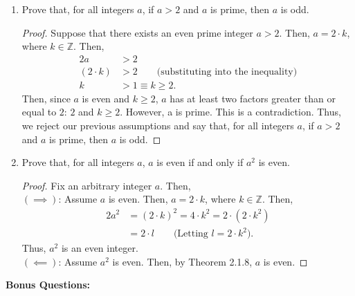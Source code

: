 \documentclass{article}
\begin{document}
\begin{enumerate}
	\item Prove that, for all integers $a$, if $a > 2$ and $a$ is prime, then $a$ is odd.
            \begin{proof}
                Suppose that there exists an even prime integer $a > 2$. Then, $a = 2\cdot k$, where $k\in \mathbb{Z}$. Then,
                \begin{alignat*}{2}
                    a &> 2 \\
                    (2 \cdot k) &> 2 \qquad \textrm{(substituting into the inequality)} \\
                    k &> 1 \equiv k \ge 2.
                \end{alignat*}
                Then, since $a$ is even and $k \ge 2$, $a$ has at least two factors greater than or equal to $2$: $2$ and $k \ge 2$. However, a is prime. This is a contradiction. Thus, we reject our previous assumptions and say that, for all integers $a$, if $a > 2$ and $a$ is prime, then $a$ is odd.
            \end{proof}

	\item Prove that, for all integers $a$, $a$ is even if and only if $a^2$ is even.
            \begin{proof}
                Fix an arbitrary integer $a$. Then,\\

                \quad \emph{$(\implies)$}: Assume $a$ is even. Then, $a = 2\cdot k$, where $k \in \mathbb{Z}$. Then,
                \begin{alignat*}{2}
                    a^2 &= (2 \cdot k)^2 = 4\cdot k^2 = 2\cdot (2\cdot k^2) \\
                    &= 2\cdot l \qquad \textrm{(Letting $l = 2\cdot k^2$).}
                \end{alignat*}
                \quad Thus, $a^2$ is an even integer. \\

                \quad \emph{$(\impliedby)$}: Assume $a^2$ is even. Then, by Theorem 2.1.8, $a$ is even.

            \end{proof}
        
\end{enumerate}

\newpage
\textbf{Bonus Questions:}
\end{document}
